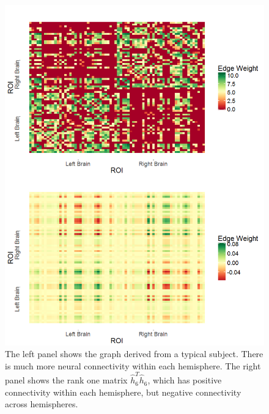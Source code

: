 \documentclass[simplex.tex]{subfiles}
\begin{document}
\begin{figure}[!h]
\begin{cframed}
\includegraphics[scale=0.25, clip = true, trim = 0 -0.45in 0 8in]{../../figs/cci_data.png}
\caption{The left panel shows the graph derived from a typical subject.
  There is much more neural connectivity within each hemisphere. The
  right panel shows the rank one matrix $\hat{h}_6^T\hat{h}_6$, which
  has positive  connectivity within each hemisphere, but negative
  connectivity across hemispheres.}
\label{fig:cci1}
\end{cframed}
\end{figure}
%
\clearpage
\end{document}
